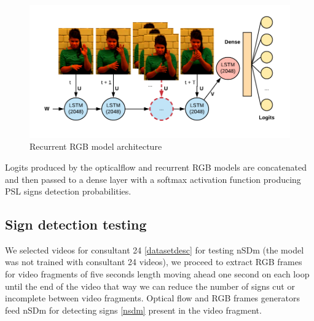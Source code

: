 \documentclass[twocolumn,conference]{article}
\begin{document}
\begin{figure}[hbt!]
\includegraphics[width=\linewidth]{images/recurrent-rgb-model-architecture.png}
\caption{Recurrent RGB model architecture}
\label{fig:rgb-architecture}
\end{figure}

Logits produced by the opticalflow and recurrent RGB models are concatenated and then passed to a dense layer with a softmax activation function producing PSL signs detection probabilities.

\subsection{Sign detection testing}\label{new-videos-testing}
We selected videos for consultant 24 \ref{datasetdesc} for testing nSDm (the model was not trained with consultant 24 videos), we proceed to extract RGB frames for video fragments of five seconds length moving ahead one second on each loop until the end of the video that way we can reduce the number of signs cut or incomplete between video fragments. Optical flow and RGB frames generators feed nSDm for detecting signs \ref{nsdm} present in the video fragment.
\end{document}
